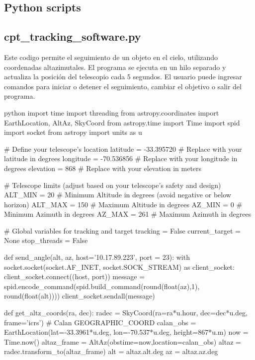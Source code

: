 \begin{appendixs}

\section{Python scripts}

\subsection{cpt\_tracking\_software.py}

Este codigo permite el seguimiento de un objeto en el cielo, utilizando coordenadas altazimutales. El programa se ejecuta en un hilo separado y actualiza la posición del telescopio cada 5 segundos. El usuario puede ingresar comandos para iniciar o detener el seguimiento, cambiar el objetivo o salir del programa.

\begin{sourcecode}[]{python}{}
    import time
    import threading
    from astropy.coordinates import EarthLocation, AltAz, SkyCoord
    from astropy.time import Time
    import spid
    import socket
    from astropy import units as u
    
    # Define your telescope's location
    latitude = -33.395720  # Replace with your latitude in degrees
    longitude = -70.536856  # Replace with your longitude in degrees
    elevation = 868  # Replace with your elevation in meters
    
    # Telescope limits (adjust based on your telescope's safety and design)
    ALT_MIN = 20  # Minimum Altitude in degrees (avoid negative or below horizon)
    ALT_MAX = 150  # Maximum Altitude in degrees
    AZ_MIN = 0   # Minimum Azimuth in degrees
    AZ_MAX = 261 # Maximum Azimuth in degrees
    
    # Global variables for tracking and target
    tracking = False
    current_target = None
    stop_threads = False
    
    def send_angle(alt, az, host='10.17.89.223', port = 23):
        with socket.socket(socket.AF_INET, socket.SOCK_STREAM) as client_socket:
            client_socket.connect((host, port))
            message = spid.encode_command(spid.build_command(round(float(az),1), round(float(alt))))
            client_socket.sendall(message)
    
    
    def get_altz_coords(ra, dec):
        radec = SkyCoord(ra=ra*u.hour, dec=dec*u.deg, frame='icrs')
        # Calan GEOGRAPHIC_COORD
        calan_obs = EarthLocation(lat=-33.3961*u.deg, lon=-70.537*u.deg, height=867*u.m)
        now = Time.now()
        altaz_frame = AltAz(obstime=now,location=calan_obs)
        altaz = radec.transform_to(altaz_frame)
        alt = altaz.alt.deg
        az = altaz.az.deg
    

\end{sourcecode}
\end{appendixs}
